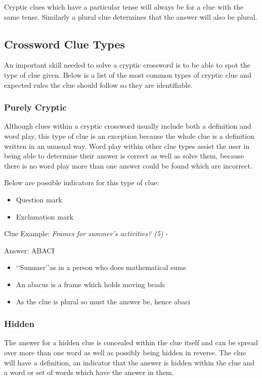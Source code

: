 Cryptic clues which have a particular tense will always be for a clue with the same tense. Similarly a plural clue determines that the answer will also be plural.

\subsection{Crossword Clue Types}
An important skill needed to solve a cryptic crossword is to be able to spot the type of clue given. Below is a list of the most common types of cryptic clue and expected rules the clue should follow so they are identifiable. 

\subsubsection{Purely Cryptic}
Although clues within a cryptic crossword usually include both a definition and word play, this type of clue is an exception because the whole clue is a definition written in an unusual way. Word play within other clue types assist the user in being able to determine their answer is correct as well as solve them, because there is no word play more than one answer could be found which are incorrect.  

Below are possible indicators for this type of clue:
\begin{itemize} 
	\item Question mark 
	\item Exclamation mark
\\
\end{itemize} 

Clue Example: \emph{Frames for summer's activities? (5)} - \citep{shuchiCryptic08}

Answer: ABACI 

\begin{itemize}
	\item \lq\lq Summer\rq\rq as in a person who does mathematical sums 
	\item An abacus is a frame which holds moving beads 
	\item As the clue is plural so must the answer be, hence abaci
\end{itemize}

\subsubsection{Hidden} 
The answer for a hidden clue is concealed within the clue itself and can be spread over more than one word as well as possibly being hidden in reverse. The clue will have a definition, an indicator that the answer is hidden within the clue and a word or set of words which have the answer in them.  

